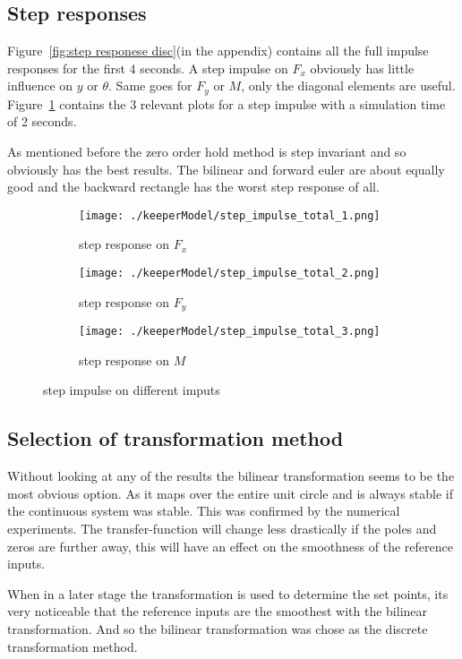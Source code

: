 \subsection{Step responses}
Figure~\ref{fig:step responese disc}(in the appendix) contains all the full impulse responses for the first 4 seconds. A step impulse on $F_x$ obviously has little influence on $y$ or $\theta$. Same goes for $F_y$ or $M$, only the diagonal elements are useful. Figure~\ref{fig:step response diag} contains the 3 relevant plots for a step impulse with a simulation time of 2 seconds. 

As mentioned before the zero order hold method is step invariant and so obviously has the best results. The bilinear and forward euler are about equally good and the backward rectangle has the worst step response of all.

\begin{figure}[H]
	\centering
	\begin{subfigure}[b]{0.45\textwidth}
		\texttt{[image: ./keeperModel/step\_impulse\_total\_1.png]}
		\caption{step response on $F_x$}
	\end{subfigure}
	\begin{subfigure}[b]{0.45\textwidth}
		\texttt{[image: ./keeperModel/step\_impulse\_total\_2.png]}
		\caption{step response on $F_y$}
	\end{subfigure}
	\begin{subfigure}[b]{0.45\textwidth}
		\texttt{[image: ./keeperModel/step\_impulse\_total\_3.png]}
		\caption{step response on $M$}
	\end{subfigure}
	\caption{step impulse on different imputs}
	\label{fig:step response diag}
\end{figure}

\subsection{Selection of transformation method}
Without looking at any of the results the bilinear transformation seems to be the most obvious option. As it maps over the entire unit circle and is always stable if the continuous system was stable. This was confirmed by the numerical experiments. The transfer-function will change less drastically if the poles and zeros are further away, this will have an effect on the smoothness of the reference inputs. 

When in a later stage the transformation is used to determine the set points, its very noticeable that the reference inputs are the smoothest with the bilinear transformation. And so the bilinear transformation was chose as the discrete transformation method.